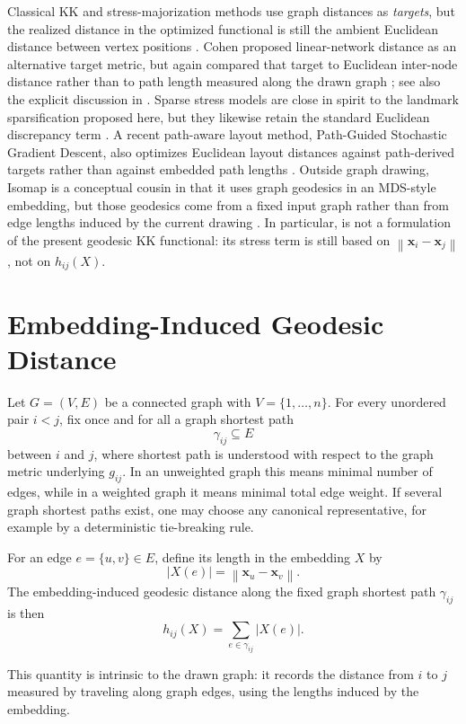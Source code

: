 \documentclass[11pt]{article}
\newcommand{\norm}[1]{\left\lVert #1 \right\rVert}
\newcommand{\vect}[1]{\mathbf{#1}}
\begin{document}
Classical KK and stress-majorization methods use graph distances as \emph{targets}, but the
realized distance in the optimized functional is still the ambient Euclidean distance between
vertex positions \cite{kamada1989algorithm,gansner2004stress}. Cohen proposed
linear-network distance as an alternative target metric, but again compared that target to
Euclidean inter-node distance rather than to path length measured along the drawn graph
\cite{cohen1997drawing}; see also the explicit discussion in \cite{koren2003axis}. Sparse
stress models are close in spirit to the landmark sparsification proposed here, but they
likewise retain the standard Euclidean discrepancy term \cite{ortmann2017sparse}. A recent
path-aware layout method, Path-Guided Stochastic Gradient Descent, also optimizes Euclidean
layout distances against path-derived targets rather than against embedded path lengths
\cite{heumos2024pangenome}. Outside graph drawing, Isomap is a conceptual cousin in that it
uses graph geodesics in an MDS-style embedding, but those geodesics come from a fixed input
graph rather than from edge lengths induced by the current drawing \cite{tenenbaum2000global}.
In particular, \cite{gansner2004stress} is not a formulation of the present geodesic KK
functional: its stress term is still based on $\norm{\vect{x}_i-\vect{x}_j}$, not on
$h_{ij}(X)$.

\section*{Embedding-Induced Geodesic Distance}

Let $G=(V,E)$ be a connected graph with $V=\{1,\dots,n\}$. For every unordered pair
$i<j$, fix once and for all a graph shortest path
\[
\gamma_{ij} \subseteq E
\]
between $i$ and $j$, where shortest path is understood with respect to the graph metric
underlying $g_{ij}$. In an unweighted graph this means minimal number of edges, while in a
weighted graph it means minimal total edge weight. If several graph shortest paths exist, one
may choose any canonical representative, for example by a deterministic tie-breaking rule.

For an edge $e=\{u,v\}\in E$, define its length in the embedding $X$ by
\[
|X(e)| = \norm{\vect{x}_u-\vect{x}_v}.
\]
The embedding-induced geodesic distance along the fixed graph shortest path $\gamma_{ij}$
is then
\[
h_{ij}(X) = \sum_{e\in\gamma_{ij}} |X(e)|.
\]

This quantity is intrinsic to the drawn graph: it records the distance from $i$ to $j$
measured by traveling along graph edges, using the lengths induced by the embedding.
\end{document}
